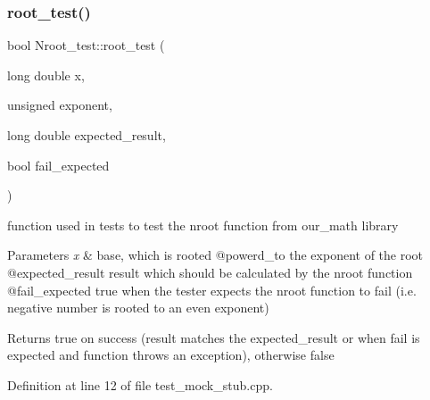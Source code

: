 \subsubsection{\texorpdfstring{root\_test()}{root\_test()}}
{\footnotesize\ttfamily bool Nroot\+\_\+test\+::root\+\_\+test (\begin{DoxyParamCaption}\item[{long double}]{x,  }\item[{unsigned}]{exponent,  }\item[{long double}]{expected\+\_\+result,  }\item[{bool}]{fail\+\_\+expected }\end{DoxyParamCaption})\hspace{0.3cm}{\ttfamily [protected]}}



function used in tests to test the nroot function from our\+\_\+math library 


\begin{DoxyParams}{Parameters}
{\em x} & base, which is rooted @powerd\+\_\+to the exponent of the root @expected\+\_\+result result which should be calculated by the nroot function @fail\+\_\+expected true when the tester expects the nroot function to fail (i.\+e. negative number is rooted to an even exponent) \\
\hline
\end{DoxyParams}
\begin{DoxyReturn}{Returns}
true on success (result matches the expected\+\_\+result or when fail is expected and function throws an exception), otherwise false 
\end{DoxyReturn}


Definition at line 12 of file test\+\_\+mock\+\_\+stub.\+cpp.


\begin{DoxyCode}{0}

\end{DoxyCode}


